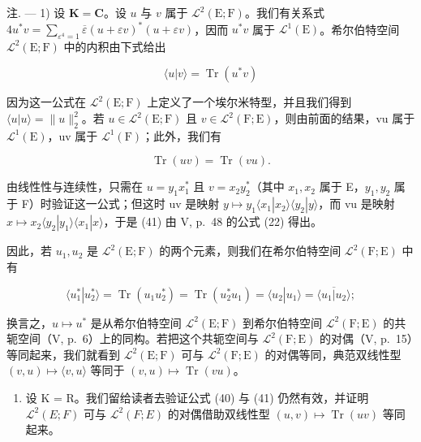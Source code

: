 注. --- 1) 设 \(\mathbf{K} = \mathbf{C}\)。设 \(u\) 与 \(v\) 属于 \(\mathcal{L}^2(\mathrm{E};\mathrm{F})\)。我们有关系式 \(4u^{*}v = \sum_{\varepsilon^{4} = 1}\overline{\varepsilon} (u + \varepsilon v)^{*}(u + \varepsilon v)\)，因而 \(u^{*}v\) 属于 \(\mathcal{L}^1(\mathrm{E})\)。希尔伯特空间 \(\mathcal{L}^2(\mathrm{E};\mathrm{F})\) 中的内积由下式给出

\[
\langle u | v \rangle = \operatorname{Tr} (u ^ {*} v)\tag{40}
\]

因为这一公式在 \(\mathcal{L}^{2}(\mathrm{E};\mathrm{F})\) 上定义了一个埃尔米特型，并且我们得到 \(\langle u|u\rangle=\|u\|_{2}^{2}\)。若 \(u\in\mathcal{L}^{2}(\mathrm{E};\mathrm{F})\) 且 \(v\in\mathcal{L}^{2}(\mathrm{F};\mathrm{E})\)，则由前面的结果，vu 属于 \(\mathcal{L}^{1}(\mathrm{E})\)，uv 属于 \(\mathcal{L}^{1}(\mathrm{F})\)；此外，我们有

\[
\operatorname{Tr} (u v) = \operatorname{Tr} (v u).\tag{41}
\]

由线性性与连续性，只需在 \(u = y_{1}x_{1}^{*}\) 且 \(v = x_{2}y_{2}^{*}\)（其中 \(x_{1}, x_{2}\) 属于 E，\(y_{1}, y_{2}\) 属于 F）时验证这一公式；但这时 uv 是映射 \(y \mapsto y_{1} \langle x_{1}|x_{2} \rangle \langle y_{2}|y \rangle\)，而 vu 是映射 \(x \mapsto x_{2} \langle y_{2}|y_{1} \rangle \langle x_{1}|x \rangle\)，于是 (41) 由 V, p.~48 的公式 (22) 得出。

因此，若 \(u_{1}, u_{2}\) 是 \(\mathcal{L}^2(\mathrm{E};\mathrm{F})\) 的两个元素，则我们在希尔伯特空间 \(\mathcal{L}^2(\mathrm{F};\mathrm{E})\) 中有

\[
\langle u _ {1} ^ {*} | u _ {2} ^ {*} \rangle = \operatorname{Tr} (u _ {1} u _ {2} ^ {*}) = \operatorname{Tr} (u _ {2} ^ {*} u _ {1}) = \langle u _ {2} | u _ {1} \rangle = \overline {{\langle u _ {1} | u _ {2} \rangle}};\tag{42}
\]

换言之，\(u \mapsto u^*\) 是从希尔伯特空间 \(\mathcal{L}^2(\mathrm{E};\mathrm{F})\) 到希尔伯特空间 \(\mathcal{L}^2(\mathrm{F};\mathrm{E})\) 的共轭空间（V, p.~6）上的同构。若把这个共轭空间与 \(\mathcal{L}^2 (\mathrm{F};\mathrm{E})\) 的对偶（V, p.~15）等同起来，我们就看到 \(\mathcal{L}^2 (\mathrm{E};\mathrm{F})\) 可与 \(\mathcal{L}^2 (\mathrm{F};\mathrm{E})\) 的对偶等同，典范双线性型 \((v,u)\mapsto \langle v,u\rangle\) 等同于 \((v,u)\mapsto \operatorname {Tr}(vu)\)。

\begin{enumerate}
\def\labelenumi{\arabic{enumi})}
\setcounter{enumi}{1}
\tightlist
\item
  设 K = R。我们留给读者去验证公式 (40) 与 (41) 仍然有效，并证明 \(\mathcal{L}^{2}(E; F)\) 可与 \(\mathcal{L}^{2}(F; E)\) 的对偶借助双线性型 \((u, v) \mapsto \operatorname{Tr}(uv)\) 等同起来。
\end{enumerate}

